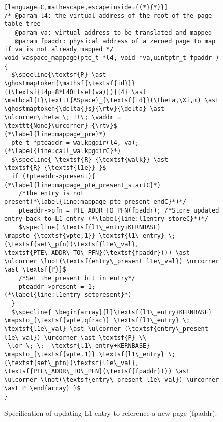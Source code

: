 \begin{figure}\footnotesize
  \begin{lstlisting}[language=C,mathescape,escapeinside={(*}{*)}]
/* @param l4: the virtual address of the root of the page table tree
   @param va: virtual address to be translated and mapped
   @param fpaddr: physical address of a zeroed page to map if va is not already mapped */
void vaspace_mappage(pte_t *l4, void *va,uintptr_t fpaddr ) {
  $\specline{\textsf{P} \ast \ghostmaptoken{\mathsf{\textsf{id}}}{(\textsf{l4p+8*L4Offset(va)})}{4} \ast \mathcal{I}\texttt{ASpace}_{\textsf{id}}(\theta,\Xi,m) \ast \ghostmaptoken{\delta{}s}{\rtv}{\delta} \ast \ulcorner\theta \; !!\; \vaddr = \texttt{None}\urcorner}_{\rtv}$ (*\label{line:mappage_pre}*)
  pte_t *pteaddr = walkpgdir(l4, va); (*\label{line:call_walkpgdirC}*)
  $\specline{ \textsf{R}_{\textsf{walk}} \ast \textsf{R}_{\textsf{l1e}} }$
  if (!pteaddr->present){ (*\label{line:mappage_pte_present_startC}*)
    /*The entry is not present(*\label{line:mappage_pte_present_endC}*)*/
    pteaddr->pfn = PTE_ADDR_TO_PFN(fpaddr); /*Store updated entry back to L1 entry (*\label{line:l1entry_storeC}*)*/
    $\specline{ \textsf{l1\_entry+KERNBASE} \mapsto_{\textsf{vpte,1}} \textsf{l1\_entry} \; (\textsf{set\_pfn}(\textsf{l1e\_val}, \textsf{PTE\_ADDR\_TO\_PFN}(\textsf{fpaddr}))) \ast  \ulcorner \lnot(\textsf{entry\_present l1e\_val}) \urcorner \ast \textsf{P}}$
    /*Set the present bit in entry*/
    pteaddr->present = 1;(*\label{line:l1entry_setpresent}*)
  }
  $\specline{ \begin{array}{l}\textsf{l1\_entry+KERNBASE} \mapsto_{\textsf{vpte,qfrac}} \textsf{l1\_entry} \; \textsf{l1e\_val} \ast \ulcorner (\textsf{entry\_present l1e\_val}) \urcorner \ast \textsf{P} \\
 \lor \; \;  \textsf{l1\_entry+KERNBASE} \mapsto_{\textsf{vpte,1}} \textsf{l1\_entry} \; (\textsf{set\_pfn}(\textsf{l1e\_val}, \textsf{PTE\_ADDR\_TO\_PFN}(\textsf{fpaddr}))) \ast  \ulcorner \lnot(\textsf{entry\_present l1e\_val}) \urcorner \ast P \end{array} }$
}
\end{lstlisting}
\vspace{-2em}
  \caption{Specification of updating L1 entry to reference a new page (\textsf{fpaddr}).}
\label{fig:mapping_codeC}
\end{figure}


